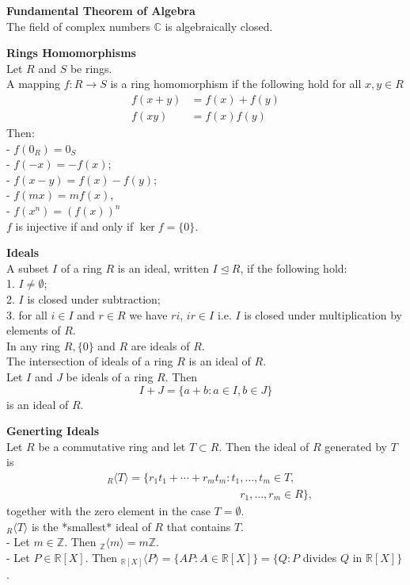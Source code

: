 \documentclass[a4paper, 10pt]{article}
\begin{document}
\begin{multicols*}{3}
\textbf{Fundamental Theorem of Algebra}\\
The field of complex numbers $\mathbb{C}$ is algebraically closed.

\textbf{Rings Homomorphisms}\\
Let $R$ and $S$ be rings. \\
A mapping $f: R \longrightarrow S$ is a ring homomorphism if the following hold for all $x, y \in R$ 
\begin{align*}
f(x+y) & =f(x)+f(y) \\
f(x y) & =f(x) f(y)
\end{align*}
Then:\\
- $f\left(0_R\right)=0_S$\\
- $f(-x)=-f(x)$;\\
- $f(x-y)=f(x)-f(y)$;\\
- $f(m x)=m f(x)$,\\
- $f\left(x^n\right)=(f(x))^n$\\
$f$ is injective if and only if $\operatorname{ker} f=\{0\}$.

\textbf{Ideals}\\
A subset $I$ of a ring $R$ is an ideal, written $I \unlhd R$, if the following hold:\\
1. $I \neq \emptyset$;\\
2. $I$ is closed under subtraction;\\
3. for all $i \in I$ and $r \in R$ we have $r i$, $ir \in I$ i.e. $I$ is closed under multiplication by elements of $R$.\\
In any ring $R,\{0\}$ and $R$ are ideals of $R$. \\
The intersection of ideals of a ring $R$ is an ideal of $R$.\\
Let $I$ and $J$ be ideals of a ring $R$. Then
$$
I+J=\{a+b: a \in I, b \in J\}
$$
is an ideal of $R$.

\textbf{Generting Ideals}\\
Let $R$ be a commutative ring and let $T \subset R$. 
Then the ideal of $R$ generated by $T$ is 
\begin{align*}
&{ }_R\langle T\rangle=\{r_1 t_1+\cdots+r_m t_m: t_1, \ldots, t_m \in T, \\
&\qquad\qquad\qquad\qquad\qquad\qquad r_1, \ldots, r_m \in R\},
\end{align*}
together with the zero element in the case $T=\emptyset$. \\
${ }_R\langle T\rangle$ is the *smallest* ideal of $R$ that contains $T$.\\
- Let $m \in \mathbb{Z}$. Then ${ }_{\mathbb{Z}}\langle m\rangle=m \mathbb{Z}$.\\
- Let $P \in \mathbb{R}[X]$. Then ${}_{\mathbb{R}[X]}\langle P\rangle=\{A P: A \in \mathbb{R}[X]\}=\{Q: P$ divides $Q$ in $\mathbb{R}[X]\}$.


\end{multicols*}
\end{document}
